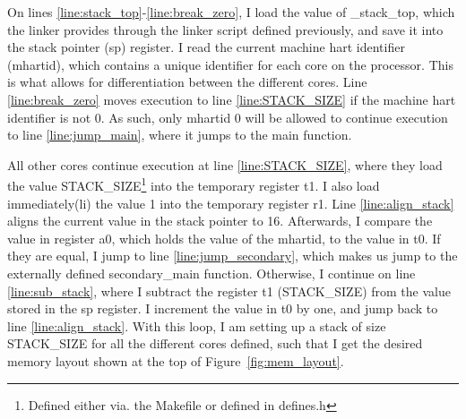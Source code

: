 On lines \ref{line:stack_top}-\ref{line:break_zero}, I load the value of
\_stack\_top, which the linker provides through the linker script defined
previously, and save it into the stack pointer (sp) register. I read the
current machine hart identifier (mhartid), which contains a unique identifier
for each core on the processor. This is what allows for differentiation between
the different cores. Line \ref{line:break_zero} moves execution to line
\ref{line:STACK_SIZE} if the machine hart identifier is not 0. As such, only
mhartid 0 will be allowed to continue execution to line \ref{line:jump_main},
where it jumps to the main function.

All other cores continue execution at line \ref{line:STACK_SIZE}, where they
load the value STACK\_SIZE\footnote{Defined either via. the Makefile or defined
in defines.h} into the temporary register t1. I also load immediately(li) the
value 1 into the temporary register r1. Line \ref{line:align_stack} aligns the
current value in the stack pointer to 16. Afterwards, I compare the value in
register a0, which holds the value of the mhartid, to the value in t0. If they
are equal, I jump to line \ref{line:jump_secondary}, which makes us jump to the
externally defined secondary\_main function. Otherwise, I continue on line
\ref{line:sub_stack}, where I subtract the register t1 (STACK\_SIZE) from the
value stored in the sp register. I increment the value in t0 by one, and jump
back to line \ref{line:align_stack}. With this loop, I am setting up a stack
of size STACK\_SIZE for all the different cores defined, such that I get the
desired memory layout shown at the top of Figure~\ref{fig:mem_layout}.

